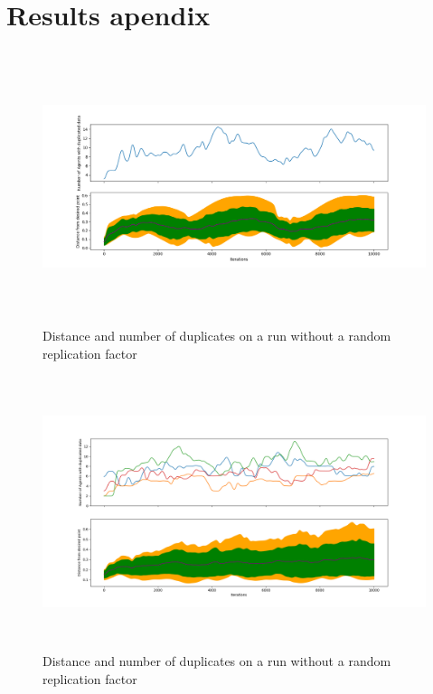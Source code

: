 \documentclass{UoYCSproject}
\begin{document}
\chapter{Results apendix}

\begin{figure}[htb]
\label{fig:Data1}
\begin{center}
\centering
\includegraphics[width=\linewidth, height=8cm]{"./PrelimData/SimpleSuicRep_m4_r0.5_c1_n50.png"}
\caption{Distance and number of duplicates on a run without a random replication factor}
\end{center}
\end{figure}

\begin{figure}[htb]
\label{fig:Data2}
\begin{center}
\centering
\includegraphics[width=\linewidth, height=8cm]{"./PrelimData/SimpleSuicideReplication_4d_4m_0.5r_50n.png"}
\caption{Distance and number of duplicates on a run without a random replication factor}
\end{center}
\end{figure}
\end{document}

